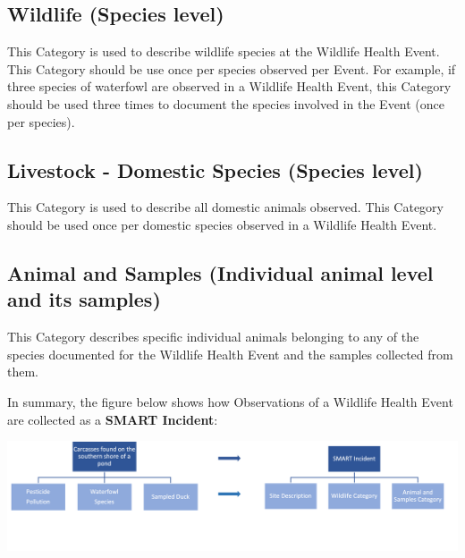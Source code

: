 \documentclass[
  letterpaper,
  DIV=11,
  numbers=noendperiod]{scrreprt}
\begin{document}
\hypertarget{wildlife-species-level}{%
\subsection*{Wildlife (Species level)}\label{wildlife-species-level}}

This Category is used to describe wildlife species at the Wildlife
Health Event. This Category should be use once per species observed per
Event. For example, if three species of waterfowl are observed in a
Wildlife Health Event, this Category should be used three times to
document the species involved in the Event (once per species).

\hypertarget{livestock---domestic-species-species-level}{%
\subsection*{Livestock - Domestic Species (Species
level)}\label{livestock---domestic-species-species-level}}

This Category is used to describe all domestic animals observed. This
Category should be used once per domestic species observed in a Wildlife
Health Event.

\hypertarget{animal-and-samples-individual-animal-level-and-its-samples}{%
\subsection*{Animal and Samples (Individual animal level and its
samples)}\label{animal-and-samples-individual-animal-level-and-its-samples}}

This Category describes specific individual animals belonging to any of
the species documented for the Wildlife Health Event and the samples
collected from them.

In summary, the figure below shows how Observations of a Wildlife Health
Event are collected as a \textbf{SMART Incident}:

\includegraphics{Pictures_for_manual/Picture5.png}
\end{document}
